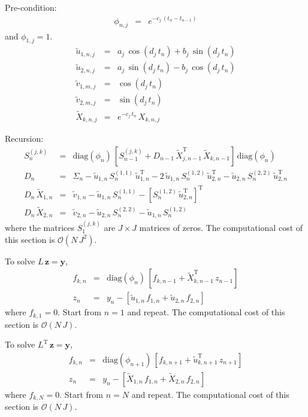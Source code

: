 \documentclass[manuscript, letterpaper]{aastex6}
\makeatletter
\let\origsubsection\subsection
\renewcommand\subsection{\@ifstar{\starsubsection}{\nostarsubsection}}
\newcommand\nostarsubsection[1]{\subsectionprelude\origsubsection{#1}}
\newcommand\starsubsection[1]{\subsectionprelude\origsubsection*{#1}}
\newcommand\subsectionprelude{\vspace{1em}}
\newcommand{\T}{\ensuremath{\mathrm{T}}}
\newcommand{\bvec}[1]{{\ensuremath{\boldsymbol{#1}}}}
\newcommand{\diag}{{\ensuremath{\mathrm{diag}}}}
\makeatother
\begin{document}
Pre-condition:
\begin{eqnarray}
\phi_{n,j} &=& e^{-c_j\,(t_n-t_{n-1})}
\end{eqnarray}
and $\phi_{1,j}=1$.
\begin{eqnarray}
\tilde{u}_{1,n,j} &=& a_j\,\cos(d_j\,t_n) + b_j\,\sin(d_j\,t_n) \\
\tilde{u}_{2,n,j} &=& a_j\,\sin(d_j\,t_n) - b_j\,\cos(d_j\,t_n) \\
\tilde{v}_{1,m,j} &=& \cos(d_j\,t_n) \\
\tilde{v}_{2,m,j} &=& \sin(d_j\,t_n) \\
\tilde{X}_{k,n,j} &=& e^{-c_j\,t_n}\,X_{k,n,j}
\end{eqnarray}

Recursion:
\begin{eqnarray}
S^{(j,k)}_n &=& \diag(\phi_{n})\,\left[
    S^{(j,k)}_{n-1} + D_{n-1}\,\tilde{X}_{j,n-1}^\T\,\tilde{X}_{k,n-1}
\right]\,\diag(\phi_{n})\\
D_n &=& \Sigma_n
    - \tilde{u}_{1,n}\,S^{(1,1)}_{n}\,\tilde{u}_{1,n}^\T
    - 2\,\tilde{u}_{1,n}\,S^{(1,2)}_{n}\,\tilde{u}_{2,n}^\T
    -\tilde{u}_{2,n}\,S^{(2,2)}_{n}\,\tilde{u}_{2,n}^\T \\
D_n\,\tilde{X}_{1,n} &=& \tilde{v}_{1,n}
    - \tilde{u}_{1,n}\,S^{(1,1)}_{n}
    - {\left[S^{(1,2)}_{n}\,\tilde{u}_{2,n}^\T\right]}^\T \\
D_n\,\tilde{X}_{2,n} &=& \tilde{v}_{2,n}
    - \tilde{u}_{2,n}\,S^{(2,2)}_{n}
    - \tilde{u}_{1,n}\,S^{(1,2)}_{n}
\end{eqnarray}
where the matrices $S^{(j,k)}_1$ are $J \times J$ matrices of zeros.
The computational cost of this section is $\mathcal{O}(N\,J^2)$.

\subsection{Solving}

To solve $L\,\bvec{z} = \bvec{y}$,
\begin{eqnarray}
f_{k,n} &=& \diag(\phi_n)\,\left[f_{k,n-1} + \tilde{X}_{k,{n-1}}^\T\,z_{n-1}\right] \\
z_n &=& y_n - \left[\tilde{u}_{1,n}\,f_{1,n} + \tilde{u}_{2,n}\,f_{2,n}\right]
\end{eqnarray}
where $f_{k,1} = 0$.
Start from $n = 1$ and repeat.
The computational cost of this section is $\mathcal{O}(N\,J)$.

To solve $L^\T\,\bvec{z} = \bvec{y}$,
\begin{eqnarray}
f_{k,n} &=& \diag(\phi_{n+1})\,\left[f_{k,n+1} + \tilde{u}_{k,{n+1}}^\T\,z_{n+1}\right] \\
z_n &=& y_n - \left[\tilde{X}_{1,n}\,f_{1,n} + \tilde{X}_{2,n}\,f_{2,n}\right]
\end{eqnarray}
where $f_{k,N} = 0$.
Start from $n = N$ and repeat.
The computational cost of this section is $\mathcal{O}(N\,J)$.
\end{document}
